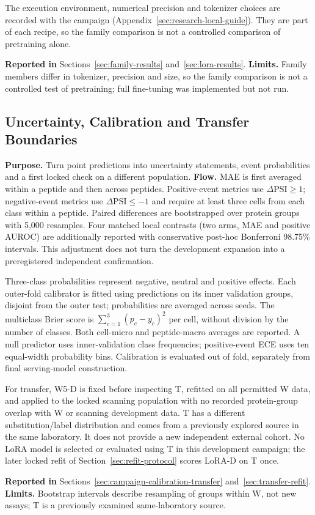 The execution environment, numerical precision and tokenizer choices are recorded with the
campaign (Appendix~\ref{sec:research-local-guide}). They are part of each recipe, so the family
comparison is not a controlled comparison of pretraining alone.

\textbf{Reported in} Sections~\ref{sec:family-results} and~\ref{sec:lora-results}. \textbf{Limits.} Family
members differ in tokenizer, precision and size, so the family comparison is not a controlled test of
pretraining; full fine-tuning was implemented but not run.

\subsection{Uncertainty, Calibration and Transfer Boundaries}
\textbf{Purpose.} Turn point predictions into uncertainty statements, event probabilities and a first locked check on a different population.
\textbf{Flow.}
MAE is first averaged within a peptide and then across peptides. Positive-event metrics use
$\Delta\mathrm{PSI}\ge1$; negative-event metrics use $\Delta\mathrm{PSI}\le-1$ and require at least
three cells from each class within a peptide. Paired differences are bootstrapped over protein
groups with 5,000 resamples. Four matched local contrasts (two arms, MAE and positive AUROC)
are additionally reported with conservative post-hoc Bonferroni 98.75\% intervals. This adjustment
does not turn the development expansion into a preregistered independent confirmation.

Three-class probabilities represent negative, neutral and positive effects. Each outer-fold
calibrator is fitted using predictions on its inner validation groups, disjoint from the outer test;
probabilities are averaged across seeds. The multiclass Brier score is
$\sum_{c=1}^{3}(p_c-y_c)^2$ per cell, without division by the number of classes. Both cell-micro and
peptide-macro averages are reported. A null predictor uses inner-validation class frequencies;
positive-event ECE uses ten equal-width probability bins. Calibration is evaluated out of fold,
separately from final serving-model construction.

For transfer, W5-D is fixed before inspecting T, refitted on all permitted W data, and applied to
the locked scanning population with no recorded protein-group overlap with W or scanning development
data. T has a different substitution/label distribution and comes from a previously explored source
in the same laboratory. It does not provide a new independent external cohort. No LoRA model is
selected or evaluated using T in this development campaign; the later locked refit of
Section~\ref{sec:refit-protocol} scores LoRA-D on T once.

\textbf{Reported in} Sections~\ref{sec:campaign-calibration-transfer} and~\ref{sec:transfer-refit}.
\textbf{Limits.} Bootstrap intervals describe resampling of groups within W, not new assays; T is a
previously examined same-laboratory source.
